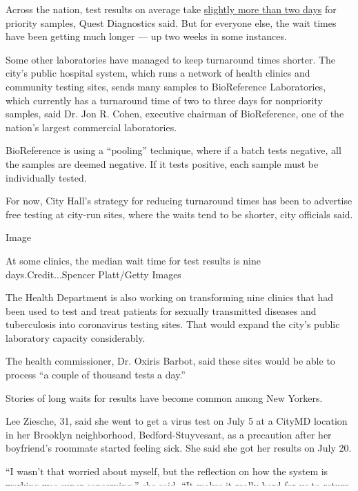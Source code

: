 Across the nation, test results on average take
\href{https://newsroom.questdiagnostics.com/COVIDTestingUpdates}{slightly
more than two days} for priority samples, Quest Diagnostics said. But
for everyone else, the wait times have been getting much longer --- up
two weeks in some instances.

Some other laboratories have managed to keep turnaround times shorter.
The city's public hospital system, which runs a network of health
clinics and community testing sites, sends many samples to BioReference
Laboratories, which currently has a turnaround time of two to three days
for nonpriority samples, said Dr. Jon R. Cohen, executive chairman of
BioReference, one of the nation's largest commercial laboratories.

BioReference is using a ``pooling'' technique, where if a batch tests
negative, all the samples are deemed negative. If it tests positive,
each sample must be individually tested.

For now, City Hall's strategy for reducing turnaround times has been to
advertise free testing at city-run sites, where the waits tend to be
shorter, city officials said.

Image

At some clinics, the median wait time for test results is nine
days.Credit...Spencer Platt/Getty Images

The Health Department is also working on transforming nine clinics that
had been used to test and treat patients for sexually transmitted
diseases and tuberculosis into coronavirus testing sites. That would
expand the city's public laboratory capacity considerably.

The health commissioner, Dr. Oxiris Barbot, said these sites would be
able to process ``a couple of thousand tests a day.''

Stories of long waits for results have become common among New Yorkers.

Lee Ziesche, 31, said she went to get a virus test on July 5 at a CityMD
location in her Brooklyn neighborhood, Bedford-Stuyvesant, as a
precaution after her boyfriend's roommate started feeling sick. She said
she got her results on July 20.

``I wasn't that worried about myself, but the reflection on how the
system is working was super concerning,'' she said. ``It makes it really
hard for us to return to normal when it takes two weeks for us to get
tests.''

Zach Honig, 34, who lives in the Financial District, said he was tested
on July 12 in anticipation of a trip to Maine and still had not gotten
his results.

